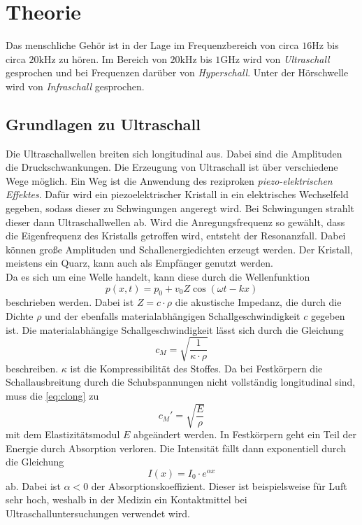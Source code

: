\section{Theorie}
\label{sec:Theorie}

Das menschliche Gehör ist in der Lage im Frequenzbereich von circa $16 \unit\hertz$ bis circa $20 \unit{\kilo\hertz}$ zu hören.
Im Bereich von $20 \unit{\kilo\hertz}$ bis $1 \unit{\giga\hertz}$ wird von \textit{Ultraschall} gesprochen und bei Frequenzen darüber von \textit{Hyperschall}.
Unter der Hörschwelle wird von \textit{Infraschall} gesprochen.


\subsection{Grundlagen zu Ultraschall}

Die Ultraschallwellen breiten sich longitudinal aus.
Dabei sind die Amplituden die Druckschwankungen. 
Die Erzeugung von Ultraschall ist über verschiedene Wege möglich.
Ein Weg ist die Anwendung des reziproken \textit{piezo-elektrischen Effektes}.
Dafür wird ein piezoelektrischer Kristall in ein elektrisches Wechselfeld gegeben, sodass dieser zu Schwingungen angeregt wird.
Bei Schwingungen strahlt dieser dann Ultraschallwellen ab.
Wird die Anregungsfrequenz so gewählt, dass die Eigenfrequenz des Kristalls getroffen wird, entsteht der Resonanzfall.
Dabei können große Amplituden und Schallenergiedichten erzeugt werden.
Der Kristall, meistens ein Quarz, kann auch als Empfänger genutzt werden.\\
Da es sich um eine Welle handelt, kann diese durch die Wellenfunktion
\begin{equation}
    p(x, t) = p_0 + v_0 Z \cos (\omega t - k x)
\end{equation}
beschrieben werden. Dabei ist $Z = c \cdot \rho$ die akustische Impedanz, die durch die Dichte $\rho$
und der ebenfalls materialabhängigen Schallgeschwindigkeit $c$ gegeben ist.
Die materialabhängige Schallgeschwindigkeit lässt sich durch die Gleichung
\begin{equation} \label{eq:clong}
    c_M = \sqrt{\frac{1}{\kappa \cdot \rho}}
\end{equation}
beschreiben. $\kappa$ ist die Kompressibilität des Stoffes.
Da bei Festkörpern die Schallausbreitung durch die Schubspannungen nicht vollständig longitudinal sind, muss die \autoref{eq:clong} zu
\begin{equation}
    c_M ' = \sqrt{\frac{E}{\rho}}
\end{equation}
mit dem Elastizitätsmodul $E$ abgeändert werden.
In Festkörpern geht ein Teil der Energie durch Absorption verloren.
Die Intensität fällt dann exponentiell durch die Gleichung
\begin{equation}
    I(x) = I_0 \cdot e^{\alpha x}
\end{equation}
ab. Dabei ist $\alpha < 0$ der Absorptionskoeffizient.
Dieser ist beispielsweise für Luft sehr hoch, weshalb in der Medizin ein Kontaktmittel bei Ultraschalluntersuchungen verwendet wird. \\

